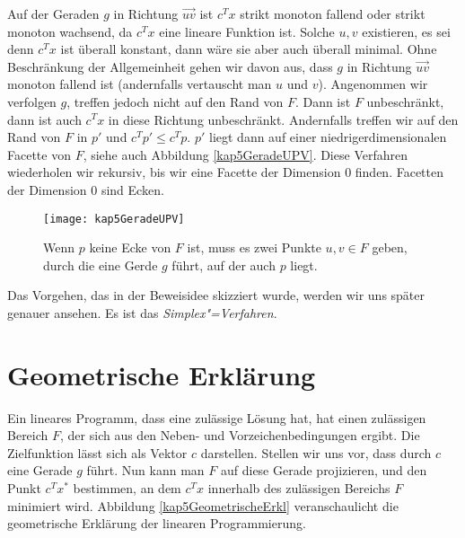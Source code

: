 Auf der Geraden $g$ in Richtung $\overrightarrow{uv}$ ist $c^Tx$ strikt monoton fallend oder strikt monoton wachsend, da $c^Tx$ eine lineare Funktion ist. Solche $u, v$ existieren, es sei denn $c^T x$ ist überall konstant, dann wäre sie aber auch überall minimal. Ohne Beschränkung der Allgemeinheit gehen wir davon aus, dass $g$ in Richtung  $\overrightarrow{uv}$ monoton fallend ist (andernfalls vertauscht man $u$ und $v$). Angenommen wir verfolgen $g$, treffen jedoch nicht auf den Rand von $F$. Dann ist $F$ unbeschränkt, dann ist auch $c^T x$ in diese Richtung unbeschränkt. Andernfalls treffen wir auf den Rand von $F$ in $p'$ und $c^T p' \le c^Tp$. $p'$ liegt dann auf einer niedrigerdimensionalen Facette von $F$, siehe auch Abbildung \vref{kap5GeradeUPV}. Diese Verfahren wiederholen wir rekursiv, bis wir eine Facette der Dimension $0$ finden. Facetten der Dimension $0$ sind Ecken.

\begin{figure}[htb]
  \centering
  \texttt{[image: kap5GeradeUPV]}
  \caption{Wenn $p$ keine Ecke von $F$ ist, muss es zwei Punkte $u, v \in F$ geben, durch die eine Gerde $g$ führt, auf der auch $p$ liegt.}
  \label{kap5GeradeUPV}
\end{figure}

Das Vorgehen, das in der Beweisidee skizziert wurde, werden wir uns später genauer ansehen. Es ist das \textit{Simplex"=Verfahren}.


\section{Geometrische Erklärung}
Ein lineares Programm, dass eine zulässige Lösung hat, hat einen zulässigen Bereich $F$, der sich aus den Neben- und Vorzeichenbedingungen ergibt. Die Zielfunktion lässt sich als Vektor $c$ darstellen. Stellen wir uns vor, dass durch $c$ eine Gerade $g$ führt. Nun kann man $F$ auf diese Gerade projizieren, und den Punkt $c^Tx^*$ bestimmen, an dem $c^Tx$ innerhalb des zulässigen Bereichs $F$ minimiert wird. Abbildung \vref{kap5GeometrischeErkl} veranschaulicht die geometrische Erklärung der linearen Programmierung.

